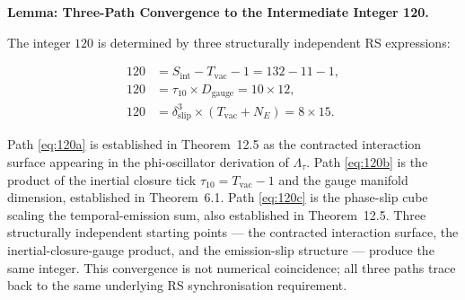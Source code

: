 \documentclass[11pt, letterpaper]{article}
\newcommand{\Sinter}{S_{\mathrm{int}}}
\theoremstyle{definition}
\theoremstyle{plain}
\begin{document}
\begin{rsbox}
\textbf{Lemma: Three-Path Convergence to the Intermediate Integer 120.}

The integer $120$ is determined by three structurally independent RS expressions:

\begin{align}
    120 &= \Sinter - T_\mathrm{vac} - 1 = 132 - 11 - 1, \label{eq:120a}\\
    120 &= \tau_{10} \times D_\mathrm{gauge} = 10 \times 12, \label{eq:120b}\\
    120 &= \delta_\mathrm{slip}^3 \times (T_\mathrm{vac} + N_E) = 8 \times 15. \label{eq:120c}
\end{align}

Path \eqref{eq:120a} is established in Theorem~12.5 as the contracted interaction surface
appearing in the phi-oscillator derivation of $\Lambda_\tau$.
Path \eqref{eq:120b} is the product of the inertial closure tick $\tau_{10} = T_\mathrm{vac} - 1$
and the gauge manifold dimension, established in Theorem~6.1.
Path \eqref{eq:120c} is the phase-slip cube scaling the temporal-emission sum, also established
in Theorem~12.5.
Three structurally independent starting points — the contracted interaction surface, the
inertial-closure-gauge product, and the emission-slip structure — produce the same integer.
This convergence is not numerical coincidence; all three paths trace back to the same
underlying RS synchronisation requirement.
\end{rsbox}
\end{document}
